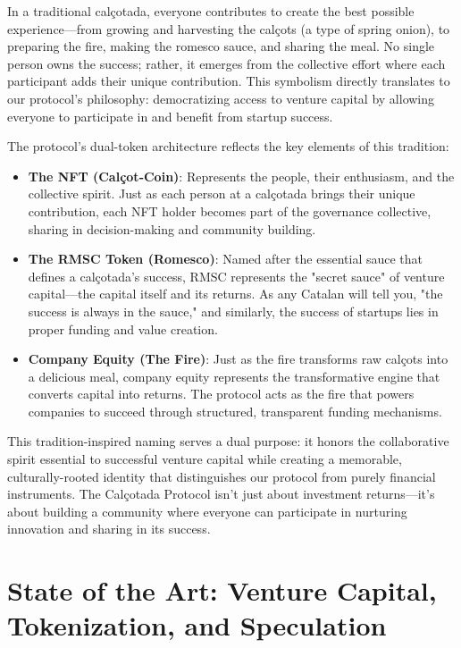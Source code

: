 \documentclass[conference]{IEEEtran}
\begin{document}
In a traditional calçotada, everyone contributes to create the best possible experience—from growing and harvesting the calçots (a type of spring onion), to preparing the fire, making the romesco sauce, and sharing the meal. No single person owns the success; rather, it emerges from the collective effort where each participant adds their unique contribution. This symbolism directly translates to our protocol's philosophy: democratizing access to venture capital by allowing everyone to participate in and benefit from startup success.

The protocol's dual-token architecture reflects the key elements of this tradition:

\begin{itemize}
    \item \textbf{The NFT (Calçot-Coin)}: Represents the people, their enthusiasm, and the collective spirit. Just as each person at a calçotada brings their unique contribution, each NFT holder becomes part of the governance collective, sharing in decision-making and community building.

    \item \textbf{The RMSC Token (Romesco)}: Named after the essential sauce that defines a calçotada's success, RMSC represents the "secret sauce" of venture capital—the capital itself and its returns. As any Catalan will tell you, "the success is always in the sauce," and similarly, the success of startups lies in proper funding and value creation.

    \item \textbf{Company Equity (The Fire)}: Just as the fire transforms raw calçots into a delicious meal, company equity represents the transformative engine that converts capital into returns. The protocol acts as the fire that powers companies to succeed through structured, transparent funding mechanisms.
\end{itemize}

This tradition-inspired naming serves a dual purpose: it honors the collaborative spirit essential to successful venture capital while creating a memorable, culturally-rooted identity that distinguishes our protocol from purely financial instruments. The Calçotada Protocol isn't just about investment returns—it's about building a community where everyone can participate in nurturing innovation and sharing in its success.

\section{State of the Art: Venture Capital, Tokenization, and Speculation}
\end{document}
